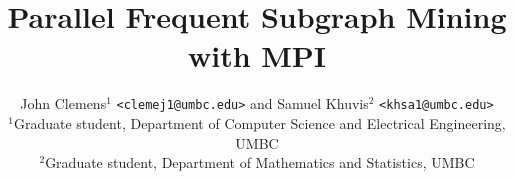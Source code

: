\documentclass{article}
\title{Parallel Frequent Subgraph Mining with MPI}
\author{John Clemens$^1$ \texttt{<clemej1@umbc.edu>} and Samuel Khuvis$^2$ \texttt{<khsa1@umbc.edu>}\\
	$^1$Graduate student, Department of Computer Science and Electrical Engineering, UMBC\\
	$^2$Graduate student, Department of Mathematics and Statistics, UMBC}
\begin{document}
\maketitle










{}

\end{document}
